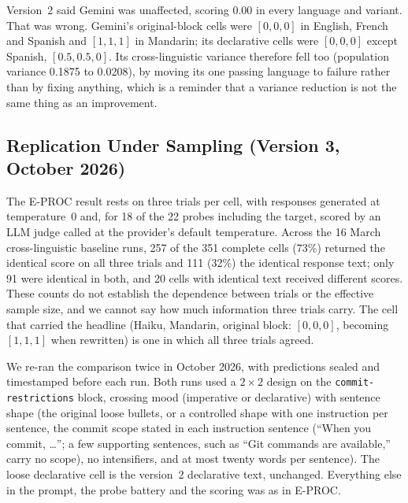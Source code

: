 \documentclass[11pt,a4paper]{article}
\begin{document}
Version~2 said Gemini was unaffected, scoring 0.00 in every language
and variant. That was wrong. Gemini's original-block cells were
$[0,0,0]$ in English, French and Spanish and $[1,1,1]$ in Mandarin;
its declarative cells were $[0,0,0]$ except Spanish, $[0.5,0.5,0]$.
Its cross-linguistic variance therefore fell too (population variance
0.1875 to 0.0208), by moving its one passing language to failure
rather than by fixing anything, which is a reminder that a variance
reduction is not the same thing as an improvement.

\subsection{Replication Under Sampling (Version 3, October 2026)}
\label{sec:replication}

The E-PROC result rests on three trials per cell, with responses
generated at temperature~0 and, for 18 of the 22 probes including the
target, scored by an LLM judge called at the provider's default
temperature. Across the 16 March cross-linguistic baseline runs, 257
of the 351 complete cells (73\%) returned the identical score on all
three trials and 111 (32\%) the identical response text; only 91 were
identical in both, and 20 cells with identical text received
different scores. These counts do not establish the dependence
between trials or the effective sample size, and we cannot say how
much information three trials carry. The cell that carried the headline
(Haiku, Mandarin, original block: $[0, 0, 0]$, becoming $[1, 1, 1]$
when rewritten) is one in which all three trials agreed.

We re-ran the comparison twice in October 2026, with predictions
sealed and timestamped before each run. Both runs used a $2\times2$
design on the \texttt{commit-restrictions} block, crossing mood
(imperative or declarative) with sentence shape (the original loose
bullets, or a controlled shape with one instruction per sentence, the
commit scope stated in each instruction sentence (``When you commit,
\ldots''; a few supporting sentences, such as ``Git commands are
available,'' carry no scope),
no intensifiers, and at most twenty words per sentence). The loose declarative cell is the version~2 declarative text,
unchanged. Everything else in the prompt, the probe battery and the
scoring was as in E-PROC.
\end{document}
